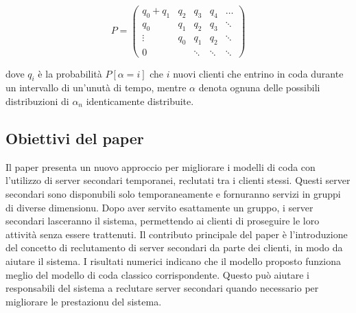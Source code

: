 \documentclass[11pt]{article}
\begin{document}
\begin{equation}
    P = \begin{pmatrix}
        q_0 + q_1 & q_2 & q_3 & q_4 & \ldots \\
        q_0 & q_1 & q_2 & q_3 & \ddots \\
        \vdots & q_0 & q_1 & q_2 & \ddots \\
        0 &  & \ddots & \ddots & \ddots
    \end{pmatrix}
\end{equation}

\noindent dove $q_i$ è la probabilità $P[\alpha=i]$ che $i$ nuovi clienti che entrino in coda durante un intervallo di un'unutà di tempo, mentre $\alpha$ denota ognuna delle possibili distribuzioni di $\alpha_n$ identicamente distribuite.



\subsection{Obiettivi del paper}

\noindent Il paper presenta un nuovo approccio per migliorare i modelli di coda con l'utilizzo di server secondari temporanei, reclutati tra i clienti stessi. Questi server secondari sono disponubili solo temporaneamente e fornuranno servizi in gruppi di diverse dimensionu. Dopo aver servito esattamente un gruppo, i server secondari lasceranno il sistema, permettendo ai clienti di proseguire le loro attività senza essere trattenuti. Il contributo principale del paper è l'introduzione del concetto di reclutamento di server secondari da parte dei clienti, in modo da aiutare il sistema. I risultati numerici indicano che il modello proposto funziona meglio del modello di coda classico corrispondente. Questo può aiutare i responsabili del sistema a reclutare server secondari quando necessario per migliorare le prestazionu del sistema. \\
\end{document}
